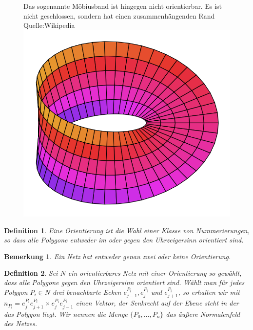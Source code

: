 \documentclass[]{article}
\newtheorem{Definition}{Definition}
\newtheorem{Bemerkung}{Bemerkung}
\begin{document}
\begin{figure}[H]
\centering
Das sogenannte Möbiusband ist hingegen nicht orientierbar. Es ist nicht geschlossen, sondern hat einen zusammenhängenden Rand Quelle:Wikipedia
\includegraphics[scale=0.2]{Moebius_strip.png}
\end{figure}

\begin{Definition}
Eine Orientierung ist die Wahl einer Klasse von Nummerierungen, so dass alle Polygone entweder im oder gegen den Uhrzeigersinn orientiert sind.
\end{Definition}

\begin{Bemerkung}
Ein Netz hat entweder genau zwei oder keine Orientierung.  
\end{Bemerkung}


\begin{Definition}
Sei $N$ ein orientierbares Netz mit einer Orientierung so gewählt, dass  alle Polygone gegen den Uhrzeigersinn orientiert sind. Wählt man für jedes Polygon $P_i \in N$ drei benachbarte Ecken $e_{j-1}^{P_i}, e_{j}^{P_i}$ und $e_{j+1}^{P_i}$, so erhalten wir
mit $n_{P_i} = e_{j}^{P_i}e_{j+1}^{P_i} \times e_{j}^{P_i}e_{j-1}^{P_i}$ einen Vektor, der Senkrecht auf der Ebene steht in der das Polygon liegt. Wir nennen die Menge $\{P_0, \hdots, P_n\}$ das äußere Normalenfeld des Netzes. 
\end{Definition}
\end{document}
